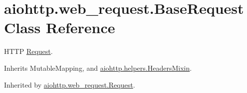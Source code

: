 \hypertarget{classaiohttp_1_1web__request_1_1_base_request}{}\section{aiohttp.\+web\+\_\+request.\+Base\+Request Class Reference}
\label{classaiohttp_1_1web__request_1_1_base_request}


H\+T\+TP \hyperlink{classaiohttp_1_1web__request_1_1_request}{Request}.  




Inherits Mutable\+Mapping, and \hyperlink{classaiohttp_1_1helpers_1_1_headers_mixin}{aiohttp.\+helpers.\+Headers\+Mixin}.



Inherited by \hyperlink{classaiohttp_1_1web__request_1_1_request}{aiohttp.\+web\+\_\+request.\+Request}.


